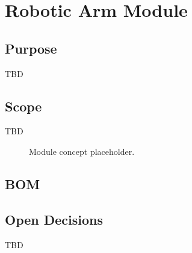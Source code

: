\chapter{Robotic Arm Module}

\section{Purpose}

TBD

\section{Scope}

TBD

\begin{figure}[h]
\centering
{}
\caption{Module concept placeholder.}
\end{figure}


\section{BOM}



\section{Open Decisions}

TBD
